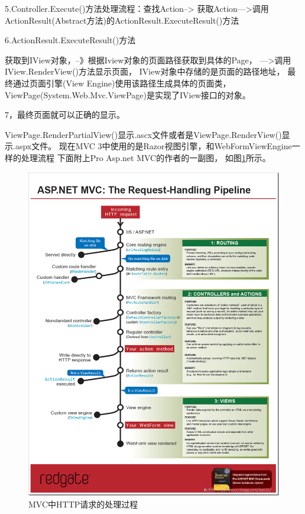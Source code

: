 \documentclass{book}
\begin{document}
5.Controller.Execute()方法处理流程：查找Action-->
获取Action--->调用ActionResult(Abstract方法)的ActionResult.ExecuteResult()方法

6.ActionResult.ExecuteResult()方法

获取到IView对象，--》根据Iview对象的页面路径获取到具体的Page，
--->调用IView.RenderView()方法显示页面，
IView对象中存储的是页面的路径地址，
最终通过页面引擎(View Engine)使用该路径生成具体的页面类，
ViewPage(System.Web.Mvc.ViewPage)是实现了IView接口的对象。

7，最终页面就可以正确的显示。

ViewPage.RenderPartialView()显示.ascx文件或者是ViewPage.RenderView()显示.aspx文件。
现在MVC 3中使用的是Razor视图引擎，和WebFormViewEngine一样的处理流程
下面附上Pro Asp.net MVC的作者的一副图，
如图\ref{fig:ASP.NETMVCRequestHandlingPipelinethumb}所示。

\begin{figure}[htbp]
	\centering
	\includegraphics[scale=0.6]{ASP.NETMVCRequestHandlingPipelinethumb.png}
	\caption{MVC中HTTP请求的处理过程}
	\label{fig:ASP.NETMVCRequestHandlingPipelinethumb}
\end{figure}
\end{document}
